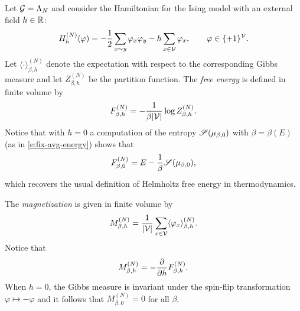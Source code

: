 Let $\mathcal{G} = \Lambda_N$
and consider the Hamiltonian for the Ising model with an external field $h\in{\mathbb R}$:
\begin{equation}
H^{(N)}_h(\varphi)
	=
-\frac12 \sum_{x \sim y} \varphi_x \varphi_y
- h \sum_{x\in\mathcal{V}} \varphi_x,
	\qquad
\varphi\in\{+1\}^{\mathcal{V}}.
\end{equation}
% 
Let $\langle\cdot\rangle^{(N)}_{\beta,h}$ denote the expectation with respect to
the corresponding Gibbs measure and let $Z^{(N)}_{\beta,h}$ be the partition function.
The \emph{free energy} is defined in finite volume by
\begin{equation}
F^{(N)}_{\beta,h}
	=
-\frac{1}{\beta |\mathcal{V}|} \log Z^{(N)}_{\beta,h}.
\end{equation}
Notice that with $h = 0$ a computation of the entropy $\mathscr{S}(\mu_{\beta,0})$
with $\beta = \beta(E)$ (as in \eqref{e:fix-avg-energy}) shows that
\begin{equation}
F^{(N)}_{\beta,0} = E - \frac{1}{\beta} \mathscr{S}(\mu_{\beta,0}),
\end{equation}
which recovers the usual definition of Helmholtz free energy in thermodynamics.

The \emph{magnetization} is given in finite volume by
\begin{equation}
M^{(N)}_{\beta,h}
	=
\frac{1}{|\mathcal{V}|} \sum_{x\in \mathcal{V}} \langle \varphi_x \rangle^{(N)}_{\beta,h}.
\end{equation}
Notice that
\begin{equation}
M^{(N)}_{\beta,h}
	=
-\frac{\partial }{\partial h} F^{(N)}_{\beta,h}.
\end{equation}
When $h = 0$, the Gibbs measure is invariant under the spin-flip transformation
$\varphi \mapsto -\varphi$ and it follows that $M^{(N)}_{\beta,0} = 0$ for all $\beta$.

